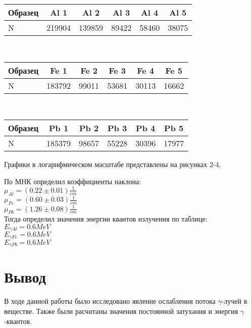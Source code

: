 \begin{table}[h!]
    \begin{center}

        \begin{tabular}{|l|c|c|c|c|c|}
        \hline
        Образец & Al 1   & Al 2   & Al 3  & Al 4  & Al 5  \\ \hline
        N       & 219904 & 139859 & 89422 & 58460 & 38075 \\ \hline
        \end{tabular} \\
        \begin{tabular}{|l|c|c|c|c|c|}
        \hline
        Образец & Fe 1   & Fe 2   & Fe 3  & Fe 4  & Fe 5  \\ \hline
        N       & 183792 & 99011  & 53681 & 30113 & 16662 \\ \hline
        \end{tabular} \\
        \begin{tabular}{|l|c|c|c|c|c|}
        \hline
        Образец & Pb 1   & Pb 2   & Pb 3  & Pb 4  & Pb 5  \\ \hline
        N       & 185379 & 98657  & 55228 & 30396 & 17977 \\ \hline
        \end{tabular}

    \end{center}
\end{table}

Графики в логарифмическом масштабе представлены на рисунках 2-4. \\


По МНК определил коэффициенты наклона: \\

$ \mu_{Al} = \left( 0.22 \pm 0.01 \right) \frac{1}{cm} $ \\

$ \mu_{Fe} = \left( 0.60 \pm 0.03 \right) \frac{1}{cm} $ \\

$ \mu_{Pb} = \left( 1.26 \pm 0.08 \right) \frac{1}{cm} $ \\

Тогда определил значения энергии квантов излучения по таблице: \\

$ E_{\gamma Al} = 0.6 MeV $ \\

$ E_{\gamma Fe} = 0.6 MeV $ \\

$ E_{\gamma Pb} = 0.6 MeV $ \\

\section{Вывод}

В ходе данной работы было исследовано явление ослабления потока $ \gamma $-лучей в веществе.
Также были расчитаны значения постоянной затухания и энергия $ \gamma $-квантов.
